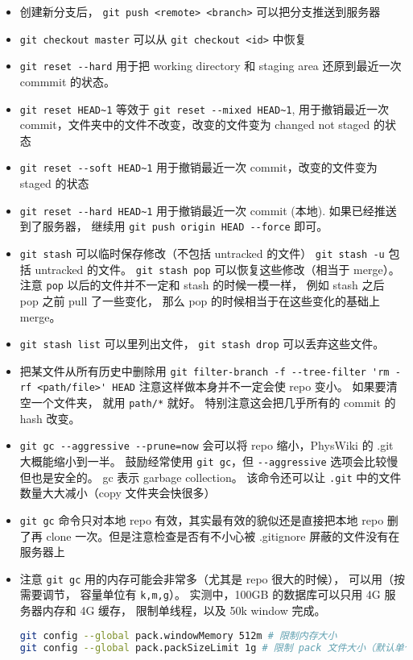 \begin{itemize}
\item 创建新分支后， \verb`git push <remote> <branch>` 可以把分支推送到服务器
\item \verb`git checkout master` 可以从 \verb`git checkout <id>` 中恢复
\item \verb`git reset --hard` 用于把 working directory 和 staging area 还原到最近一次 commmit 的状态。
\item \verb`git reset HEAD~1` 等效于 \verb`git reset --mixed HEAD~1`, 用于撤销最近一次 commit，文件夹中的文件不改变，改变的文件变为 changed not staged 的状态
\item \verb`git reset --soft HEAD~1` 用于撤销最近一次 commit，改变的文件变为 staged 的状态
\item \verb`git reset --hard HEAD~1` 用于撤销最近一次 commit (本地). 如果已经推送到了服务器， 继续用 \verb`git push origin HEAD --force` 即可。
\item \verb`git stash` 可以临时保存修改（不包括 untracked 的文件） \verb`git stash -u` 包括 untracked 的文件。 \verb`git stash pop` 可以恢复这些修改（相当于 merge）。 注意 \verb`pop` 以后的文件并不一定和 stash 的时候一模一样， 例如 stash 之后 pop 之前 pull 了一些变化， 那么 pop 的时候相当于在这些变化的基础上 merge。
\item \verb`git stash list` 可以里列出文件， \verb`git stash drop` 可以丢弃这些文件。
\item 把某文件从所有历史中删除用 \verb`git filter-branch -f --tree-filter 'rm -rf <path/file>' HEAD` 注意这样做本身并不一定会使 repo 变小。 如果要清空一个文件夹， 就用 \verb`path/*` 就好。 特别注意这会把几乎所有的 commit 的 hash 改变。
\item \verb`git gc --aggressive --prune=now` 会可以将 repo 缩小，PhysWiki 的 .git 大概能缩小到一半。 鼓励经常使用 \verb`git gc`，但 \verb`--aggressive` 选项会比较慢但也是安全的。 gc 表示 garbage collection。 该命令还可以让 \verb`.git` 中的文件数量大大减小（copy 文件夹会快很多）
\item \verb`git gc` 命令只对本地 repo 有效，其实最有效的貌似还是直接把本地 repo 删了再 clone 一次。但是注意检查是否有不小心被 .gitignore 屏蔽的文件没有在服务器上
\item 注意 \verb`git gc` 用的内存可能会非常多（尤其是 repo 很大的时候）， 可以用（按需要调节， 容量单位有 \verb`k,m,g`）。 实测中，100GB 的数据库可以只用 4G 服务器内存和 4G 缓存， 限制单线程，以及 50k window 完成。
\begin{lstlisting}[language=bash]
git config --global pack.windowMemory 512m # 限制内存大小
git config --global pack.packSizeLimit 1g # 限制 pack 文件大小（默认单个文件）

\end{lstlisting}
\end{itemize}
